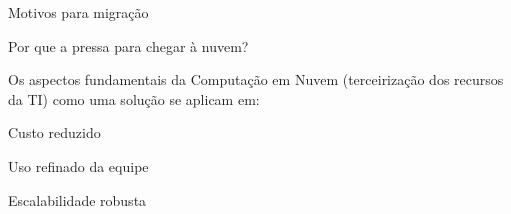 \begin{frame}{Motivos para migração}

    \begin{block}{Por que a pressa para chegar à nuvem?}
        
        Os aspectos fundamentais da Computação em Nuvem (terceirização dos
        recursos da TI) como uma solução se aplicam em: 
        
        \begin{itemise}
            \item<2-> Custo reduzido
            \item<3-> Uso refinado da equipe
            \item<4-> Escalabilidade robusta
        \end{itemise}
        
    \end{block}

    
    
\end{frame}


